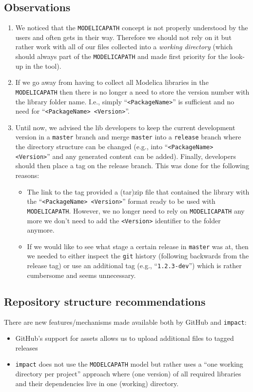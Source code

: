 \documentclass[11pt,a4paper,twocolumn]{article}
\newcommand{\code}[1]{\texttt{#1}} %
\begin{document}
\subsection{Observations}
\begin{enumerate}
\item We noticed that the \texttt{MODELICAPATH} concept is not
  properly understood by the users and often gets in their way.
  Therefore we should not rely on it but rather work with all of our
  files collected into a \emph{working directory} (which should always
  part of the \texttt{MODELICAPATH} and made first priority for the
  look-up in the tool).
\item If we go away from having to collect all Modelica libraries in
  the \texttt{MODELICAPATH} then there is no longer a need to store
  the version number with the library folder name.  I.e., simply
  ``\texttt{<PackageName>}'' is sufficient and no need for
  ``\texttt{<PackageName>~<Version>}''.

\item Until now, we advised the lib developers to keep the current
  development version in a \texttt{master} branch and merge
  \texttt{master} into a \texttt{release} branch where the directory
  structure can be changed (e.g., into ``\texttt{<PackageName>
    <Version>}'' and any generated content can be added).  Finally,
  developers should then place a tag on the release branch. This was
  done for the following reasons:
  \begin{itemize}
  \item The link to the tag provided a (tar)zip file that
    contained the library with the
    ``\texttt{<PackageName>~<Version>}'' format ready to be used with
    \texttt{MODELICAPATH}. However, we no longer need to rely on
    \texttt{MODELICAPATH} any more we don't need to add the
    \texttt{<Version>} identifier to the folder anymore.
  \item If we would like to see what stage a certain
    release in \texttt{master} was at, then we needed to either
    inspect the \code{git} history (following backwards from the
    release tag) or use an additional tag (e.g.,
    ``\texttt{1.2.3-dev}'') which is rather cumbersome and seems
    unnecessary.
  \end{itemize}
\end{enumerate}

\subsection{Repository structure recommendations}
There are new features/mechanisms made available both by GitHub and
\code{impact}:
\begin{itemize}
\item GitHub's support for assets \parencite{gh-assets} allows us to
  upload additional files to tagged releases
\item \code{impact} does not use the \texttt{MODELCAPATH} model but
  rather uses a ``one working directory per project'' approach where
  (one version) of all required libraries and their dependencies live
  in one (working) directory.
\end{itemize}
\end{document}
